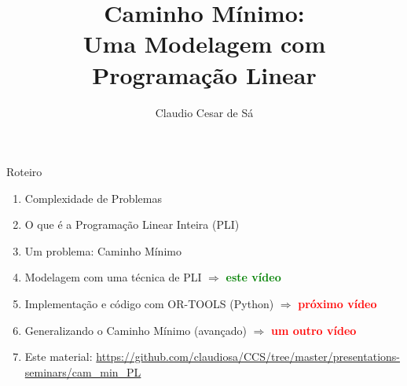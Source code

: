 \documentclass{beamer}
\title[Inteligência Artificial -- Otimização Combinatória] %
{Caminho Mínimo: \\ Uma Modelagem com\\ Programação Linear}
\author[Claudio Cesar de Sá] %
{Claudio Cesar de Sá\inst{1}}
\institute[UDESC]{Pesquisador Independente}
\date[\today] %
\begin{document}
\begin{frame}
  \titlepage
\end{frame}








\begin{frame}

\begin{block}{Roteiro}

\begin{enumerate}

  \item  Complexidade de Problemas
  \item O que é a Programação Linear Inteira (PLI)
  \item  Um problema:  Caminho Mínimo
  \item  Modelagem com uma técnica de PLI  $\Rightarrow$ \textbf{\textcolor{green}{este vídeo}}
  \item  Implementação e código com OR-TOOLS (Python) $\Rightarrow$  \textbf{\textcolor{red}{próximo vídeo}} 
  \item  Generalizando o Caminho Mínimo (avançado) $\Rightarrow$ \textbf{\textcolor{red}{um outro vídeo}} 
  \item Este material: \url{https://github.com/claudiosa/CCS/tree/master/presentations-seminars/cam_min_PL}
  \end{enumerate}

\end{block}

\end{frame}
\end{document}
